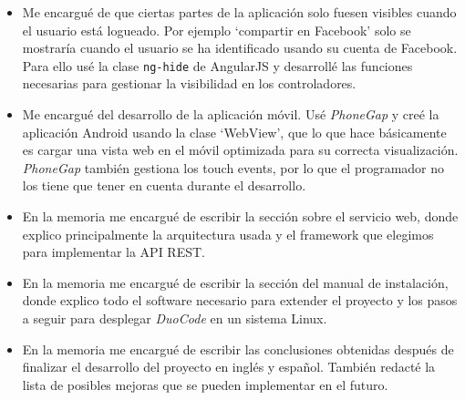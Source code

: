 \begin{itemize}
\item
Me encargué de que ciertas partes de la aplicación solo fuesen visibles cuando el usuario está logueado. Por ejemplo `compartir en Facebook' solo se mostraría cuando el usuario se ha identificado usando su cuenta de Facebook. Para ello usé la clase \texttt{ng-hide} de AngularJS y desarrollé las funciones necesarias para gestionar la visibilidad en los controladores.

\item
Me encargué del desarrollo de la aplicación móvil. Usé \textit{PhoneGap} y creé la aplicación Android usando la clase `WebView', que lo que hace básicamente es cargar una vista web en el móvil optimizada para su correcta visualización. \textit{PhoneGap} también gestiona los touch events, por lo que el programador no los tiene que tener en cuenta durante el desarrollo.

\item
En la memoria me encargué de escribir la sección sobre el servicio web, donde explico principalmente la arquitectura usada y el framework que elegimos para implementar la API REST.

\item
En la memoria me encargué de escribir la sección del manual de instalación, donde explico todo el software necesario para extender el proyecto y los pasos a seguir para desplegar \textit{DuoCode} en un sistema Linux.

\item 
En la memoria me encargué de escribir las conclusiones obtenidas después de finalizar el desarrollo del proyecto en inglés y español. También redacté la lista de posibles mejoras que se pueden implementar en el futuro.


\end{itemize}